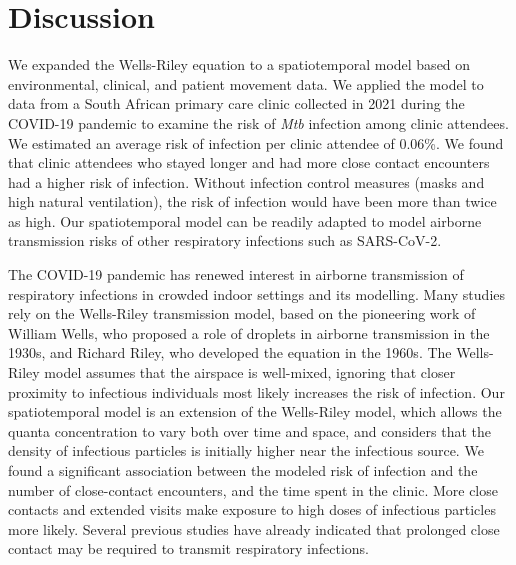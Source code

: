 \documentclass[fleqn,11pt]{wlscirep}
\begin{document}
\FloatBarrier

\newpage

\section*{Discussion}

We expanded the Wells-Riley equation to a spatiotemporal model based on environmental, clinical, and patient movement data. We applied the model to data from a South African primary care clinic collected in 2021 during the COVID-19 pandemic to examine the risk of \emph{Mtb} infection among clinic attendees. We estimated an average risk of infection per clinic attendee of 0.06\%. We found that clinic attendees who stayed longer and had more close contact encounters had a higher risk of infection. Without infection control measures (masks and high natural ventilation), the risk of infection would have been more than twice as high. Our spatiotemporal model can be readily adapted to model airborne transmission risks of other respiratory infections such as SARS-CoV-2.

The COVID-19 pandemic has renewed interest in airborne transmission of respiratory infections in crowded indoor settings\cite{Wang2021Science,Morawska2021,Greenhalgh2022BMJ} and its modelling\cite{Shen2021STBE,Buonanno2020EI,Edwards2024RiskAnalysis}. Many studies\cite{Andrews2014JID,Taylor2016IJTLD,Hella2017JInfect,Zemouri2020JDR} rely on the Wells-Riley transmission model\cite{Riley1961Book}, based on the pioneering work of William Wells, who proposed a role of droplets in airborne transmission in the 1930s\cite{Wells1934AJE}, and Richard Riley, who developed the equation in the 1960s\cite{Riley1961Book}.  The Wells-Riley model assumes that the airspace is well-mixed, ignoring that closer proximity to infectious individuals most likely increases the risk of infection. Our spatiotemporal model is an extension of the Wells-Riley model, which allows the quanta concentration to vary both over time and space, and considers that the density of infectious particles is initially higher near the infectious source\cite{Wang2021Science,Vuorinen2020SafSci,Chen2020BuildEnv}. We found a significant association between the modeled risk of infection and the number of close-contact encounters, and the time spent in the clinic. More close contacts and extended visits make exposure to high doses of infectious particles more likely. Several previous studies have already indicated that prolonged close contact may be required to transmit respiratory infections\cite{Leung2020NatMed,Brankston2007LancetID,Narasimhan2013PulmonaryMed}. 
\end{document}
